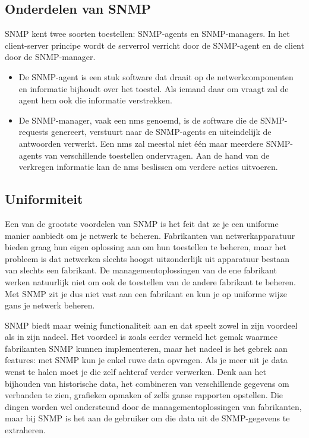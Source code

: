 \subsection{Onderdelen van SNMP}

SNMP kent twee soorten toestellen: SNMP-agents en SNMP-managers. In het client-server principe wordt de serverrol verricht door de SNMP-agent
en de client door de SNMP-manager.

\begin{itemize}
	\item De SNMP-agent is een stuk software dat draait op de netwerkcomponenten en informatie bijhoudt over het toestel.
	Als iemand daar om vraagt zal de agent hem ook die informatie verstrekken.
	
	\item De SNMP-manager, vaak een  \gls{nms} genoemd, is de software die de SNMP-requests genereert, verstuurt naar de
	SNMP-agents en uiteindelijk de antwoorden verwerkt. Een \gls{nms} zal meestal niet één maar meerdere SNMP-agents van verschillende toestellen ondervragen.
	Aan de hand van de verkregen informatie kan de \gls{nms} beslissen om verdere acties uitvoeren.
\end{itemize}


\subsection{Uniformiteit}

Een van de grootste voordelen van SNMP is het feit dat ze je een uniforme manier aanbiedt om je netwerk te beheren. Fabrikanten van netwerkapparatuur
bieden graag hun eigen oplossing aan om hun toestellen te beheren, maar het probleem is dat netwerken slechts hoogst uitzonderlijk uit apparatuur
bestaan van slechts een fabrikant. De managementoplossingen van de ene fabrikant werken natuurlijk niet om ook de toestellen van de andere
fabrikant te beheren. Met SNMP zit je dus niet vast aan een fabrikant en kun je op uniforme wijze gans je netwerk beheren.

SNMP biedt maar weinig functionaliteit aan en dat speelt zowel in zijn voordeel als in zijn nadeel.  Het voordeel is zoals eerder vermeld het
gemak waarmee fabrikanten SNMP kunnen implementeren, maar het nadeel is het gebrek aan features: met SNMP kun je enkel ruwe data opvragen.
Als je meer uit je data wenst te halen moet je die zelf achteraf verder verwerken. Denk aan het bijhouden van historische data, het combineren
van verschillende gegevens om verbanden te zien, grafieken opmaken of zelfs ganse rapporten opstellen. Die dingen worden wel ondersteund door de
managementoplossingen van fabrikanten, maar bij SNMP is het aan de gebruiker om die data uit de SNMP-gegevens te extraheren.


